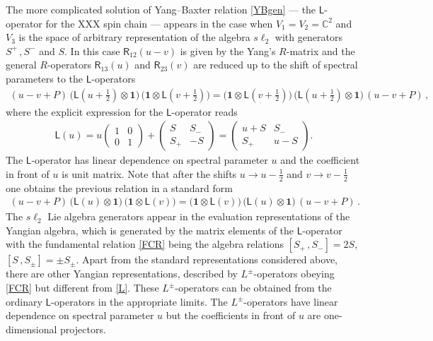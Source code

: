 \documentclass[11pt]{article}
\numberwithin{equation}{section}
\theoremstyle{plain}
\theoremstyle{definition}
\newcommand{\R}{\mathsf{R}}
\begin{document}
The more complicated solution of Yang--Baxter 
relation \eqref{YBgen} --- the $\mathsf{L}$-operator for the XXX spin chain --- appears in the case when $V_1 = V_2 = \mathbb{C}^2$ and $V_3$ is the space of arbitrary representation of the algebra  
$s\ell_2$ with generators $S^{+}\,,S^{-}$ and $S$.
In this case $\R_{12}(u-v)$ is given by the Yang's $R$-matrix 
and the general $R$-operators $\R_{13}(u)$ and $\R_{23}(v)$ are reduced 
up to the shift of spectral parameters to the $\mathsf{L}$-operators
\begin{align*}
	\textstyle \left(u-v  + P\right)\, \bigl(\mathsf{L}(u+\frac{1}{2})\otimes \bm{1}\bigr)\, 
	\bigl(\bm{1} \otimes \mathsf{L}(v+\frac{1}{2})\bigr)
	= \bigl(\bm{1} \otimes \mathsf{L}(v+\frac{1}{2})\bigr)\,
	\bigl(\mathsf{L}(u+\frac{1}{2})\otimes \bm{1}\bigr)\, \left(u-v  + P\right) \,,
\end{align*}
where the explicit expression for the $\mathsf{L}$-operator reads
\begin{align} \label{L}
	\mathsf{L}(u) = u \left( \begin{array}{cc}
		1 & 0 \\
		0 & 1 \end{array} \right) + \left( \begin{array}{cc}
		S & S_{-} \\
		S_{+} & - S \end{array} \right) = 
	\left( \begin{array}{cc}
		u + S & S_{-} \\
		S_{+} & u - S \end{array} \right) .
\end{align}
The $\mathsf{L}$-operator has linear dependence on spectral parameter $u$ 
and the coefficient in front of $u$ is unit matrix.  
Note that after the shifts $u\to u-\frac{1}{2}$ and $v\to v-\frac{1}{2}$
one obtains the previous relation in a standard form 
\begin{align}
	\label{FCR}
	\textstyle \left(u-v  + P\right)\, \bigl(\mathsf{L}(u)\otimes \bm{1}\bigr)\, 
	\bigl(\bm{1} \otimes \mathsf{L}(v)\bigr)
	= \bigl(\bm{1} \otimes \mathsf{L}(v)\bigr)\,
	\bigl(\mathsf{L}(u)\otimes \bm{1}\bigr)\, \left(u-v  + P\right) \,.
\end{align}
The $s\ell_2$ Lie algebra generators appear in
the evaluation representations of the Yangian algebra, which is
generated by the matrix elements of the $\mathsf{L}$-operator with
the fundamental relation \eqref{FCR} being the
algebra relations  
$[S_{+}\,,S_{-}] = 2 S$, $[S\,,S_{\pm}] = \pm S_{\pm}$. 
Apart from the standard representations considered above, there
are other Yangian representations, described by
$L^{\pm}$-operators obeying \eqref{FCR} but different from
\eqref{L}. These $L^{\pm}$-operators can be obtained from the ordinary
$\mathsf{L}$-operators in the appropriate limits.
The $L^{\pm}$-operators have linear dependence on spectral parameter $u$ 
but the coefficients in front of $u$ are one-dimensional projectors.  
\end{document}

